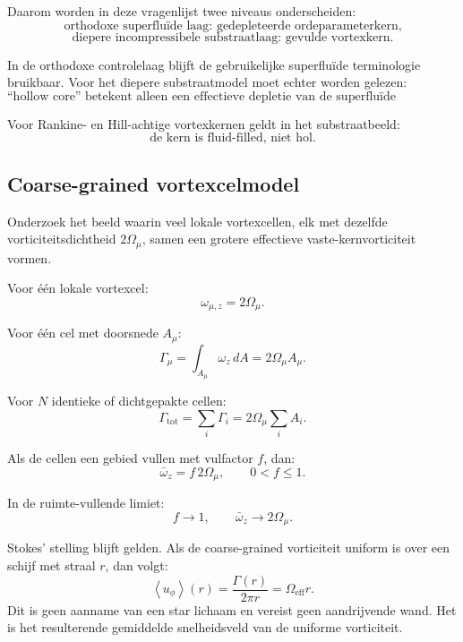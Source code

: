 \documentclass[11pt]{article}
\begin{document}
        Daarom worden in deze vragenlijst twee niveaus onderscheiden:
        \[
            \text{orthodoxe superfluïde laag: gedepleteerde ordeparameterkern,}
        \]
        \[
            \text{diepere incompressibele substraatlaag: gevulde vortexkern.}
        \]
        
        In de orthodoxe controlelaag blijft de gebruikelijke superfluïde terminologie bruikbaar. Voor het diepere substraatmodel moet echter worden gelezen:
        \[
            \boxed{
                \text{``hollow core'' betekent alleen een effectieve depletie van de superfluïde ordeparameter, niet een lege kern van het onderliggende medium.}
            }
        \]
        
        Voor Rankine- en Hill-achtige vortexkernen geldt in het substraatbeeld:
        \[
            \boxed{
                \text{de kern is fluid-filled, niet hol.}
            }
        \]
    
    \subsection{Coarse-grained vortexcelmodel}
        
        Onderzoek het beeld waarin veel lokale vortexcellen, elk met dezelfde vorticiteitsdichtheid \(2\Omega_{\mu}\), samen een grotere effectieve vaste-kernvorticiteit vormen.
        
        Voor één lokale vortexcel:
        \[
            \omega_{\mu,z}=2\Omega_{\mu}.
        \]
        
        Voor één cel met doorsnede \(A_{\mu}\):
        \[
            \Gamma_{\mu}
            =
            \int_{A_{\mu}}\omega_z\,dA
            =
            2\Omega_{\mu}A_{\mu}.
        \]
        
        Voor \(N\) identieke of dichtgepakte cellen:
        \[
            \Gamma_{\mathrm{tot}}
            =
            \sum_i\Gamma_i
            =
            2\Omega_{\mu}\sum_i A_i.
        \]
        
        Als de cellen een gebied vullen met vulfactor \(f\), dan:
        \[
            \bar{\omega}_z
            =
            f\,2\Omega_{\mu},
            \qquad
            0<f\leq1.
        \]
        
        In de ruimte-vullende limiet:
        \[
            f\rightarrow1,
            \qquad
            \bar{\omega}_z\rightarrow2\Omega_{\mu}.
        \]
        
        Stokes' stelling blijft gelden. Als de coarse-grained vorticiteit uniform is over een schijf met straal \(r\), dan volgt:
        \[
            \left\langle u_{\phi}\right\rangle(r)
            =
            \frac{\Gamma(r)}{2\pi r}
            =
            \Omega_{\mathrm{eff}}r.
        \]
        Dit is geen aanname van een star lichaam en vereist geen aandrijvende wand. Het is het resulterende gemiddelde snelheidsveld van de uniforme vorticiteit.
    
\end{document}
